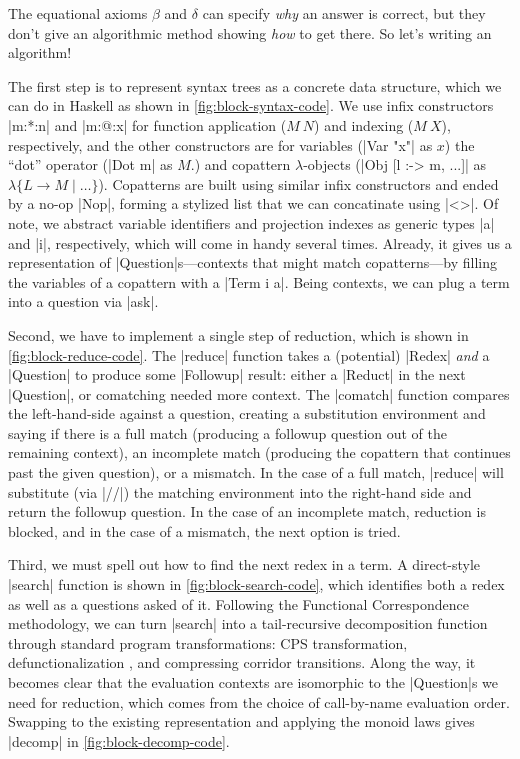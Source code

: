 \documentclass[sigplan,screen]{acmart}
\begin{document}
The equational axioms $\beta$ and $\delta$ can specify \emph{why} an answer is
correct, but they don't give an algorithmic method showing \emph{how} to get
there.  So let's writing an algorithm!

The first step is to represent syntax trees as a concrete data structure, which
we can do in Haskell as shown in \cref{fig:block-syntax-code}.  We use infix
constructors \hs|m:*:n| and \hs|m:@:x| for function application ($M~N$) and
indexing ($M~X$), respectively, and the other constructors are for variables
(\hs|Var "x"| as $x$) the ``dot'' operator (\hs|Dot m| as $M.$) and copattern
$\lambda$-objects (\hs|Obj [l :-> m, ...]| as $\lambda\{L \to M \mid \dots\}$).
Copatterns are built using similar infix constructors and ended by a no-op
\hs|Nop|, forming a stylized list that we can concatinate using \hs|<>|.  Of
note, we abstract variable identifiers and projection indexes as generic types
\hs|a| and \hs|i|, respectively, which will come in handy several times.  Already,
it gives us a representation of \hs|Question|s---contexts that might match
copatterns---by filling the variables of a copattern with a \hs|Term i a|.
Being contexts, we can plug a term into a question via \hs|ask|.

Second, we have to implement a single step of reduction, which is shown in
\cref{fig:block-reduce-code}.  The \hs|reduce| function takes a (potential)
\hs|Redex| \emph{and} a \hs|Question| to produce some \hs|Followup| result:
either a \hs|Reduct| in the next \hs|Question|, or comatching needed more
context.  The \hs|comatch| function compares the left-hand-side against a
question, creating a substitution environment and saying if there is a full
match (producing a followup question out of the remaining context), an
incomplete match (producing the copattern that continues past the given
question), or a mismatch.  In the case of a full match, \hs|reduce| will
substitute (via \hs|//|) the matching environment into the right-hand side and
return the followup question.  In the case of an incomplete match, reduction is
blocked, and in the case of a mismatch, the next option is tried.

Third, we must spell out how to find the next redex in a term.  A direct-style
\hs|search| function is shown in \cref{fig:block-search-code}, which identifies
both a redex as well as a questions asked of it.  Following the Functional
Correspondence methodology, we can turn \hs|search| into a tail-recursive
decomposition function through standard program transformations: CPS
transformation, defunctionalization \cite{DefinitionalInterpreters}, and
compressing corridor transitions.  Along the way, it becomes clear that the
evaluation contexts are isomorphic to the \hs|Question|s we need for reduction,
which comes from the choice of call-by-name evaluation order.  Swapping to the
existing representation and applying the monoid laws gives \hs|decomp| in
\cref{fig:block-decomp-code}.
\end{document}

